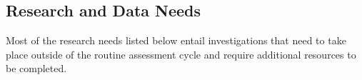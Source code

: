 \documentclass[11pt,
  english,
  a4paper,
]{article}
\begin{document}

\hypertarget{research-and-data-needs}{%
\subsection*{Research and Data Needs}\label{research-and-data-needs}}

\leavevmode\tagmcend\tagstructend


Most of the research needs listed below entail investigations that need to take place outside of the routine assessment cycle and require additional resources to be completed.

\leavevmode\tagmcend\tagstructend\par

\end{document}
